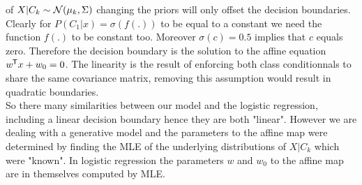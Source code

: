 of $X \vert C_k \sim \mathcal{N} (\mu_k, \Sigma)$ changing the priors will only offset the decision
boundaries.
Clearly for $P(C_1\vert x) = \sigma(f(.))$ to be equal to a constant we need the 
function $f(.)$ to be constant too. Moreover $\sigma(c) = 0.5$ implies 
that $c$ equals zero. Therefore the decision boundary is the solution to
the affine equation $w^{\mkern-1.5mu\mathsf{T}} x + w_0 = 0$. The linearity is the result of
enforcing both class conditionnals to share the same covariance matrix, 
removing this assumption would result in quadratic boundaries.\\
So there many similarities between our model and the logistic regression,
including a linear decision boundary hence they are both "linear".
However we are dealing with a generative model and the parameters 
to the affine map were determined by finding the MLE of the underlying
distributions of $X \vert C_k$ which were "known". 
In logistic regression the parameters $w$ and $w_0$ to the affine map
are in themselves computed by MLE. 






